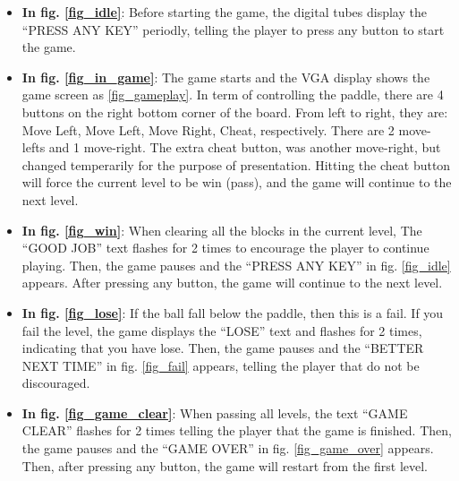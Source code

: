 \documentclass[conference]{IEEEtran}
\begin{document}
\begin{itemize}
    \item \textbf{In fig. \ref{fig_idle}}: Before starting the game, the digital tubes display the ``PRESS ANY KEY'' periodly, telling the player to press any button to start the game.
    \item \textbf{In fig. \ref{fig_in_game}}: The game starts and the VGA display shows the game screen as \ref{fig_gameplay}. In term of controlling the paddle, there are 4 buttons on the right bottom corner of the board. From left to right, they are: Move Left, Move Left, Move Right, Cheat, respectively. There are 2 move-lefts and 1 move-right. The extra cheat button, was another move-right, but changed temperarily for the purpose of presentation. Hitting the cheat button will force the current level to be win (pass), and the game will continue to the next level.
    \item \textbf{In fig. \ref{fig_win}}: When clearing all the blocks in the current level, The ``GOOD JOB'' text flashes for 2 times to encourage the player to continue playing. Then, the game pauses and the ``PRESS ANY KEY'' in fig. \ref{fig_idle} appears. After pressing any button, the game will continue to the next level.
    \item \textbf{In fig. \ref{fig_lose}}: If the ball fall below the paddle, then this is a fail. If you fail the level, the game displays the ``LOSE'' text and flashes for 2 times, indicating that you have lose. Then, the game pauses and the ``BETTER NEXT TIME'' in fig. \ref{fig_fail} appears, telling the player that do not be discouraged.
    \item \textbf{In fig. \ref{fig_game_clear}}: When passing all levels, the text ``GAME CLEAR'' flashes for 2 times telling the player that the game is finished. Then, the game pauses and the ``GAME OVER'' in fig. \ref{fig_game_over} appears. Then, after pressing any button, the game will restart from the first level.
\end{itemize}
\end{document}
